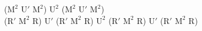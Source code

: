 ($\text{M}^2$ $\text{U}'$ $\text{M}^2$) $\text{U}^2$ ($\text{M}^2$ $\text{U}'$ $\text{M}^2$)\\
($\text{R}'$ $\text{M}^2$ R) $\text{U}'$ ($\text{R}'$ $\text{M}^2$ R) $\text{U}^2$ ($\text{R}'$ $\text{M}^2$ R) $\text{U}'$ ($\text{R}'$ $\text{M}^2$ R)\\
